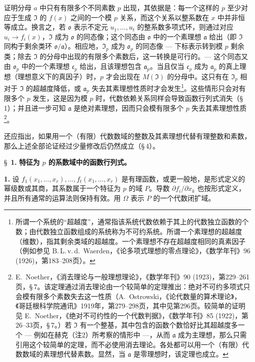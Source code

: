 证明分母 $a$ 中只有有限多个不同素数 $p$ 出现，其依据是：每一个这样的 $p$ 至少对应于生成 $\mathfrak{I}$ 的 $f(x)$ 之间的一个模 $p$ 关系，而这个关系以整系数在 $x$ 中并非恒等成立。换言之，若 $\mathfrak{o}$ 表示不定元 $u_1,\ldots,u_t$ 的整系数多项式环，则通过对应 $u_i \to f_i(x)$，$\mathfrak{I}$ 成为 $\mathfrak{o}$ 的同态像；这个同态由 $\mathfrak{o}$ 中的一个素理想 $\mathfrak{a}$ 给出（即 $\mathfrak{I}$ 同构于剩余类环 $\mathfrak{o}/\mathfrak{a}$）。相应地，$\mathfrak{I}_p$ 成为 $\mathfrak{o}_p$ 的同态像 --- 下标表示转到模 $p$ 剩余类；除去 $\mathfrak{I}$ 的分母中出现的有限多个素数后，这一转换是可行的。--- 这个同态又由 $\mathfrak{o}_p$ 中的一个素理想 $\mathfrak{c}_p$ 给出，且该理想包含 $\mathfrak{a}_p$。当且仅当 $\mathfrak{c}_p$ 成为 $\mathfrak{a}_p$ 的真上理想（理想意义下的真因子）时，$p$ 才会出现在 $M(\mathfrak{I})$ 的分母中。这只有在 $\mathfrak{I}_p$ 相对于 $\mathfrak{I}$ 的超越度降低，或 $\mathfrak{a}_p$ 失去其素理想性质时才会发生\footnote{所谓一个系统的“超越度”，通常指该系统代数依赖于其上的代数独立函数的个数；由代数独立函数组成的系统称为不可约系统。所谓一个素理想的超越度（维数），指其剩余类域的超越度。一个素理想不存在超越度相同的真素因子（例如参见 B.\,L.\,v.\,d.\ Waerden，《论多项式理想的零点理论》，《数学年刊》96 (1926)，第183--208页）。}。这些情形只会对有限多个 $p$ 发生，这是因为模 $p$ 时，代数依赖关系同样会导致函数行列式消失（\S\,1）；并且进一步可知 $\mathfrak{a}$ 是绝对素理想，因而只会模有限多个 $p$ 失去其素理想性质\footnote{E.\ Noether，《消去理论与一般理想理论》，《数学年刊》90 (1923)，第229--261页，\S\,7。该定理通过消去理论由一个较简单的定理推出：绝对不可约多项式只会模有限多个素数失去这一性质（A.\ Ostrowski，《论代数量的算术理论》，《哥廷根科学院通讯》1919年，第279--298页，其中见第296页。较简单的证明见 E.\ Noether，《绝对不可约性的一个代数判据》，《数学年刊》85 (1922)，第26--33页，\S\,7。）若 $\mathfrak{I}$ 有一个整基，其中包含的函数个数恰好比其超越度多一个 --- 例如在赫克（注2）所考察的情形中 ---，从而 $\mathfrak{a}$ 成为主理想，那么只需引用这个较简单的定理，而不必使用消去理论。各处都可以用一个（有限）代数数域的素理想代替素数。显然，当 $\mathfrak{a}$ 是零理想时，该定理也成立。}。

还应指出，如果用一个（有限）代数数域的整数及其素理想代替有理整数和素数，那么上述全部论证经过少量修改后仍然成立（\S\,4）。

\newpage
\S~\textbf{1.}
\textbf{特征为 $p$ 的系数域中的函数行列式。}

\smallskip

\noindent\textbf{1.}
设 $f_1(x_1,\ldots,x_r),\ldots,f_t(x_1,\ldots,x_r)$ 是有理函数，或更一般地，是形式定义的幂级数或其商，其系数属于一个特征为 $p$ 的域 $P$。导数 $\partial f_i/\partial x_k$ 也按形式定义，并且所有通常的运算法则保持有效。用 $\Omega$ 表示 $P$ 的一个代数闭扩域。


